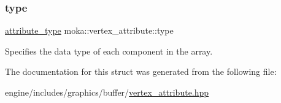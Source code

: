 \subsubsection{\texorpdfstring{type}{type}}
{\footnotesize\ttfamily \mbox{\hyperlink{namespacemoka_a1fe222f346eb65977e1069323023faa5}{attribute\+\_\+type}} moka\+::vertex\+\_\+attribute\+::type}

Specifies the data type of each component in the array. 

The documentation for this struct was generated from the following file\+:\begin{DoxyCompactItemize}
\item 
engine/includes/graphics/buffer/\mbox{\hyperlink{vertex__attribute_8hpp}{vertex\+\_\+attribute.\+hpp}}\end{DoxyCompactItemize}

